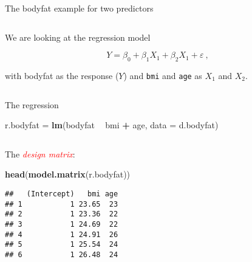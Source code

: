 \documentclass[10pt,ignorenonframetext,]{beamer}
\newenvironment{Shaded}{\begin{snugshade}}{\end{snugshade}}
\newcommand{\DataTypeTok}[1]{\textcolor[rgb]{0.13,0.29,0.53}{#1}}
\newcommand{\KeywordTok}[1]{\textcolor[rgb]{0.13,0.29,0.53}{\textbf{#1}}}
\newcommand{\NormalTok}[1]{#1}
\newcommand{\OperatorTok}[1]{\textcolor[rgb]{0.81,0.36,0.00}{\textbf{#1}}}
\newcommand{\StringTok}[1]{\textcolor[rgb]{0.31,0.60,0.02}{#1}}
\begin{document}
\begin{frame}[fragile]

\begin{block}{The bodyfat example for two predictors}

\(~\)

We are looking at the regression model

\begin{equation*}
Y = \beta_0 + \beta_{1}  X_1 + \beta_2 X_1  + \varepsilon \ ,
\end{equation*}

with bodyfat as the response (\(Y\)) and \texttt{bmi} and \texttt{age}
as \(X_1\) and \(X_2\).

\(~\)

\normalsize

The regression

\scriptsize

\begin{Shaded}
\begin{Highlighting}[]
\NormalTok{r.bodyfat =}\StringTok{ }\KeywordTok{lm}\NormalTok{(bodyfat }\OperatorTok{~}\StringTok{ }\NormalTok{bmi }\OperatorTok{+}\StringTok{ }\NormalTok{age, }\DataTypeTok{data =}\NormalTok{ d.bodyfat)}
\end{Highlighting}
\end{Shaded}

\(~\)

\normalsize

The \emph{\textcolor{red}{design matrix}}:

\scriptsize

\begin{Shaded}
\begin{Highlighting}[]
\KeywordTok{head}\NormalTok{(}\KeywordTok{model.matrix}\NormalTok{(r.bodyfat))}
\end{Highlighting}
\end{Shaded}

\begin{verbatim}
##   (Intercept)   bmi age
## 1           1 23.65  23
## 2           1 23.36  22
## 3           1 24.69  22
## 4           1 24.91  26
## 5           1 25.54  24
## 6           1 26.48  24
\end{verbatim}

\normalsize

\end{block}

\end{frame}
\end{document}
